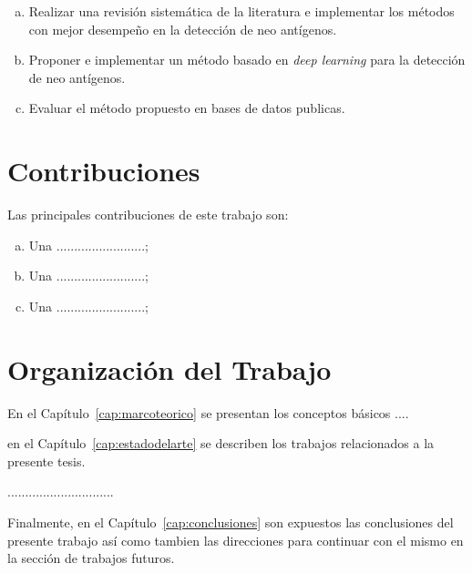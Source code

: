 \begin{enumerate}[(a)]
\item Realizar una revisión sistemática de la literatura e implementar los métodos con mejor desempeño en la detección de neo antígenos.
\item Proponer e implementar un método basado en \textit{deep learning} para la detección de neo antígenos.		
\item Evaluar el método propuesto en bases de datos publicas.
\end{enumerate}

\section{Contribuciones}
\label{sec:contribuciones}
Las principales contribuciones de este trabajo son:

\begin{enumerate}[(a)]
	\item Una .........................;
	\item Una .........................;
	\item Una .........................;
	
\end{enumerate}

\section{Organización del Trabajo}
\label{sec:organizaciondeltrabajo}
En el Capítulo~\ref{cap:marcoteorico} se presentan los conceptos básicos ....

en el Capítulo~\ref{cap:estadodelarte} se describen los trabajos relacionados a la presente tesis.

..............................

Finalmente, en el Capítulo~\ref{cap:conclusiones} son expuestos las conclusiones del presente trabajo así como 
tambien las direcciones para continuar con el mismo en la sección de trabajos futuros.



